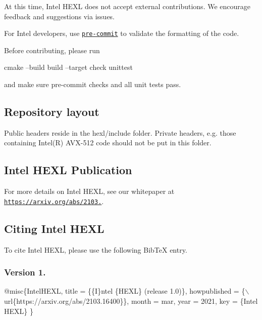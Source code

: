 At this time, Intel H\+E\+XL does not accept external contributions. We encourage feedback and suggestions via issues.

For Intel developers, use \href{https://pre-commit.com/}{\tt pre-\/commit} to validate the formatting of the code.

Before contributing, please run 
\begin{DoxyCode}
cmake --build build --target check unittest
\end{DoxyCode}
 and make sure pre-\/commit checks and all unit tests pass.

\subsection*{Repository layout}

Public headers reside in the {\ttfamily hexl/include} folder. Private headers, e.\+g. those containing Intel(\+R) A\+V\+X-\/512 code should not be put in this folder.

\subsection*{Intel H\+E\+XL Publication}

For more details on Intel H\+E\+XL, see our whitepaper at \href{https://arxiv.org/abs/2103.16400}{\tt https\+://arxiv.\+org/abs/2103.}.

\subsection*{Citing Intel H\+E\+XL}

To cite Intel H\+E\+XL, please use the following Bib\+TeX entry.

\subsubsection*{Version 1.}


\begin{DoxyCode}
@misc\{IntelHEXL,
    title = \{\{I\}ntel \{HEXL\} (release 1.0)\},
    howpublished = \{\(\backslash\)url\{https://arxiv.org/abs/2103.16400\}\},
    month = mar,
    year = 2021,
    key = \{Intel HEXL\}
\}
\end{DoxyCode}
 